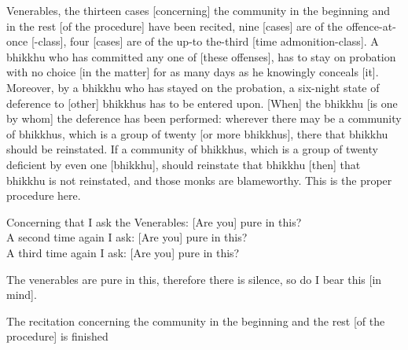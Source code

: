 \begin{center}
Venerables, the thirteen cases [concerning] the community in the beginning and in the rest [of the procedure] have been recited, nine [cases] are of the offence-at-once [-class], four [cases] are of the up-to the-third [time admonition-class]. A bhikkhu who has committed any one of [these offenses], has to stay on probation with no choice [in the matter] for as many days as he knowingly conceals [it]. Moreover, by a bhikkhu who has stayed on the probation, a six-night state of deference to [other] bhikkhus has to be entered upon. [When] the bhikkhu [is one by whom] the deference has been performed: wherever there may be a community of bhikkhus, which is a group of twenty [or more bhikkhus], there that bhikkhu should be reinstated. If a community of bhikkhus, which is a group of twenty deficient by even one [bhikkhu], should reinstate that bhikkhu [then] that bhikkhu is not reinstated, and those monks are blameworthy. This is the proper procedure here.

\smallskip

Concerning that I ask the Venerables: [Are you] pure in this?\\
A second time again I ask: [Are you] pure in this?\\
A third time again I ask: [Are you] pure in this?

\smallskip

The venerables are pure in this, therefore there is silence, so do I bear this [in mind].
\end{center}

\begin{outro}
  The recitation concerning the community in the beginning and the rest [of the procedure] is finished
\end{outro}

\clearpage
